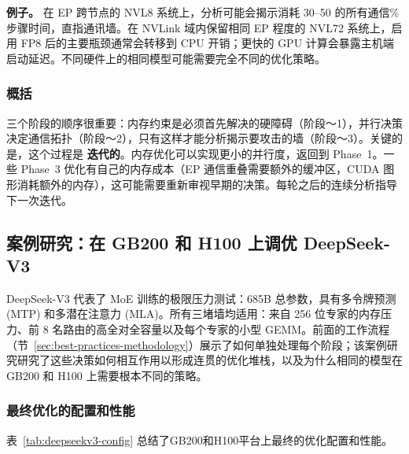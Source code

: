 \noindent\textbf{例子。} 在 EP 跨节点的 NVL8 系统上，分析可能会揭示消耗 30--50 的所有通信\% 步骤时间，直指通讯墙。在 NVLink 域内保留相同 EP 程度的 NVL72 系统上，启用 FP8 后的主要瓶颈通常会转移到 CPU 开销；更快的 GPU 计算会暴露主机端启动延迟。不同硬件上的相同模型可能需要完全不同的优化策略。

\subsubsection{概括}

三个阶段的顺序很重要：内存约束是必须首先解决的硬障碍（阶段〜1），并行决策决定通信拓扑（阶段〜2），只有这样才能分析揭示要攻击的墙（阶段〜3）。关键的是，这个过程是 \textbf{迭代的}。内存优化可以实现更小的并行度，返回到 Phase~1。一些 Phase~3 优化有自己的内存成本（EP 通信重叠需要额外的缓冲区，CUDA 图形消耗额外的内存），这可能需要重新审视早期的决策。每轮之后的连续分析指导下一次迭代。

\subsection{案例研究：在 GB200 和 H100 上调优 DeepSeek-V3}\label{sec:deepseek-case-study}

DeepSeek-V3 代表了 MoE 训练的极限压力测试：685B 总参数，具有多令牌预测 (MTP) 和多潜在注意力 (MLA)。所有三堵墙均适用：来自 256 位专家的内存压力、前 8 名路由的高全对全容量以及每个专家的小型 GEMM。前面的工作流程（节~\ref{sec:best-practices-methodology}）展示了如何单独处理每个阶段；该案例研究研究了这些决策如何相互作用以形成连贯的优化堆栈，以及为什么相同的模型在 GB200 和 H100 上需要根本不同的策略。

\subsubsection{最终优化的配置和性能}

表~\ref{tab:deepseekv3-config} 总结了GB200和H100平台上最终的优化配置和性能。

